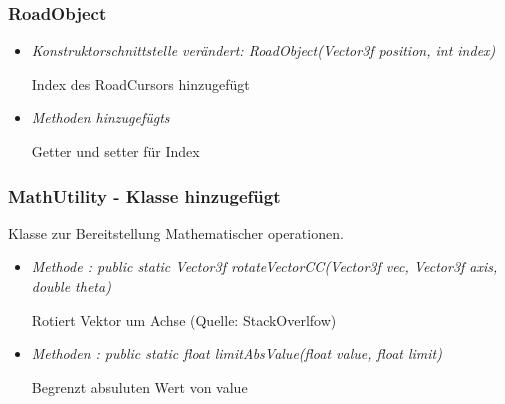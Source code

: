 \subsubsection{RoadObject}
\begin{itemize}
    \item \textit{Konstruktorschnittstelle verändert: RoadObject(Vector3f position, int index)}
        \begin{leftbar}[0.9\linewidth]
            Index des RoadCursors hinzugefügt\par
        \end{leftbar}
    \item \textit{Methoden hinzugefügts}
        \begin{leftbar}[0.9\linewidth]
            Getter und setter für Index\par
        \end{leftbar}
\end{itemize}

\subsubsection{MathUtility - Klasse hinzugefügt}
Klasse zur Bereitstellung Mathematischer operationen.
\begin{itemize}
    \item \textit{Methode : public static Vector3f rotateVectorCC(Vector3f vec, Vector3f axis, double theta)}
        \begin{leftbar}[0.9\linewidth]
            Rotiert Vektor um Achse (Quelle: StackOverlfow)\par
        \end{leftbar}
    \item \textit{Methoden : public static float limitAbsValue(float value, float limit)}
        \begin{leftbar}[0.9\linewidth]
            Begrenzt absuluten Wert von value\par
        \end{leftbar}
\end{itemize}


